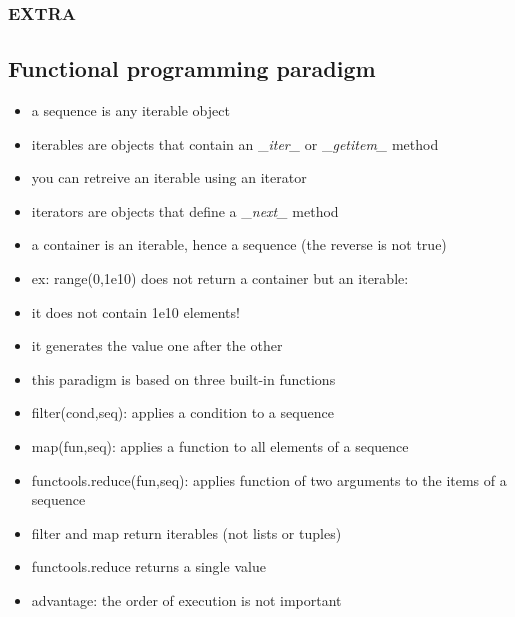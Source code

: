 \documentclass[11pt]{article}
\begin{document}
    \hypertarget{extra}{%
\subsubsection{EXTRA}\label{extra}}

    \hypertarget{functional-programming-paradigm}{%
\subsection{Functional programming
paradigm}\label{functional-programming-paradigm}}

\begin{itemize}
\item
  a sequence is any iterable object
\item
  iterables are objects that contain an \_\emph{iter\_} or
  \_\emph{getitem\_} method
\item
  you can retreive an iterable using an iterator
\item
  iterators are objects that define a \_\emph{next\_} method
\item
  a container is an iterable, hence a sequence (the reverse is not true)
\item
  ex: range(0,1e10) does not return a container but an iterable:
\item
  it does not contain 1e10 elements!
\item
  it generates the value one after the other
\item
  this paradigm is based on three built-in functions
\item
  filter(cond,seq): applies a condition to a sequence
\item
  map(fun,seq): applies a function to all elements of a sequence
\item
  functools.reduce(fun,seq): applies function of two arguments to the
  items of a sequence
\item
  filter and map return iterables (not lists or tuples)
\item
  functools.reduce returns a single value
\item
  advantage: the order of execution is not important
\end{itemize}
\end{document}
